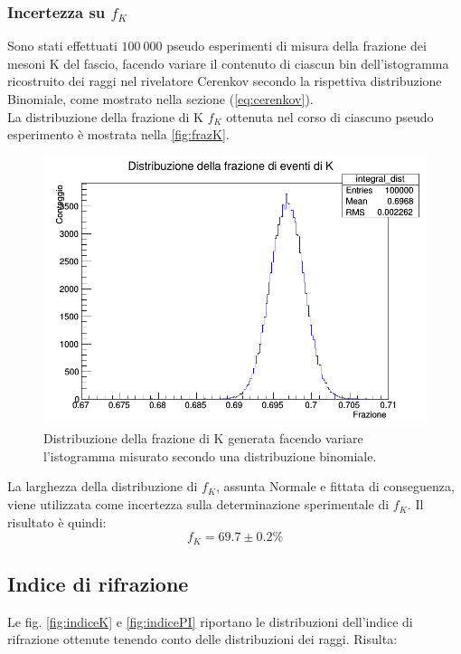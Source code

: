 \documentclass[8pt]{extarticle}
\begin{document}
\subsubsection{Incertezza su $f_K$}
Sono stati effettuati $100\ 000$ pseudo esperimenti di misura della frazione dei mesoni K del fascio, facendo variare il contenuto di ciascun bin dell'istogramma ricostruito dei raggi nel rivelatore Cerenkov secondo la rispettiva distribuzione Binomiale, come mostrato nella sezione (\ref{eq:cerenkov}).\\
La distribuzione della frazione di K $f_K$ ottenuta nel corso di ciascuno pseudo esperimento è mostrata nella \ref{fig:frazK}. \\

\begin{figure}
\begin{center}
\includegraphics[scale=0.4]{frazioneK_definitivo_fixfit}
\caption{Distribuzione della frazione di K generata facendo variare l'istogramma misurato secondo una distribuzione binomiale.}
\end{center}
\end{figure}

La larghezza della distribuzione di $f_K$, assunta Normale e fittata di conseguenza, viene utilizzata come incertezza sulla determinazione sperimentale di $f_K$. Il risultato è quindi: \\

\begin{equation}
f_K = 69.7 \pm 0.2 \%
\nonumber
\end{equation}


\subsection{Indice di rifrazione}
Le fig. \ref{fig:indiceK} e \ref{fig:indicePI} riportano le distribuzioni dell'indice di rifrazione ottenute tenendo conto delle distribuzioni dei raggi. Risulta: \\
\end{document}
